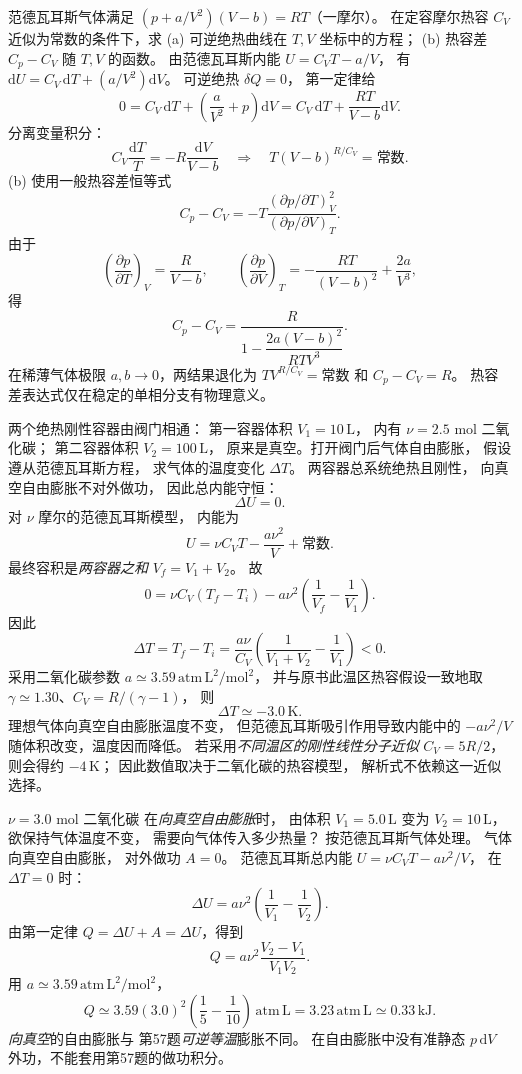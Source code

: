 范德瓦耳斯气体满足
$(p+a/V^2)(V-b)=RT$（一摩尔）。
在定容摩尔热容 $C_V$ 近似为常数的条件下，求
(a) 可逆绝热曲线在 $T,V$ 坐标中的方程；
(b) 热容差 $C_p-C_V$ 随 $T,V$ 的函数。
\exsolution
由范德瓦耳斯内能
$U=C_VT-a/V$，
有
$\mathrm dU=C_V\,\mathrm dT+(a/V^2)\mathrm dV$。
可逆绝热 $\delta Q=0$，
第一定律给
\[
0=C_V\,\mathrm dT+
\left(\frac a{V^2}+p\right)\mathrm dV
=C_V\,\mathrm dT+\frac{RT}{V-b}\mathrm dV.
\]
分离变量积分：
\[
C_V\frac{\mathrm dT}{T}
=-R\frac{\mathrm dV}{V-b}
\quad\Longrightarrow\quad
\boxed{T(V-b)^{R/C_V}=\text{常数}}.
\]
(b) 使用一般热容差恒等式
\[
C_p-C_V=
-T\frac{(\partial p/\partial T)_V^2}
{(\partial p/\partial V)_T}.
\]
由于
\[
\left(\frac{\partial p}{\partial T}\right)_V=\frac R{V-b},
\qquad
\left(\frac{\partial p}{\partial V}\right)_T
=-\frac{RT}{(V-b)^2}+\frac{2a}{V^3},
\]
得
\[
\boxed{C_p-C_V=
\frac R{1-\dfrac{2a(V-b)^2}{RTV^3}}}.
\]
\excheck 在稀薄气体极限
$a,b\to0$，两结果退化为
$TV^{R/C_V}=\text{常数}$ 和 $C_p-C_V=R$。
热容差表达式仅在稳定的单相分支有物理意义。

两个绝热刚性容器由阀门相通：
第一容器体积 $V_1=10\,\mathrm L$，
内有 $\nu=2.5$ mol 二氧化碳；
第二容器体积 $V_2=100\,\mathrm L$，
原来是真空。打开阀门后气体自由膨胀，
假设遵从范德瓦耳斯方程，
求气体的温度变化 $\Delta T$。
\exsolution
两容器总系统绝热且刚性，
向真空自由膨胀不对外做功，
因此总内能守恒：
\[
\Delta U=0.
\]
对 $\nu$ 摩尔的范德瓦耳斯模型，
内能为
\[
U=\nu C_VT-\frac{a\nu^2}{V}+\text{常数}.
\]
最终容积是\emph{两容器之和}
$V_f=V_1+V_2$。
故
\[
0=\nu C_V(T_f-T_i)
-a\nu^2\left(\frac1{V_f}-\frac1{V_1}\right).
\]
因此
\[
\boxed{\Delta T=T_f-T_i=
\frac{a\nu}{C_V}
\left(\frac1{V_1+V_2}-\frac1{V_1}\right)<0}.
\]
采用二氧化碳参数
$a\simeq3.59\,\mathrm{atm\,L^2/mol^2}$，
并与原书此温区热容假设一致地取
$\gamma\simeq1.30$、$C_V=R/(\gamma-1)$，
则
\[
\boxed{\Delta T\simeq-3.0\,\mathrm K}.
\]
\excheck 理想气体向真空自由膨胀温度不变，
但范德瓦耳斯吸引作用导致内能中的
$-a\nu^2/V$ 随体积改变，温度因而降低。
若采用\emph{不同温区的刚性线性分子近似}
$C_V=5R/2$，则会得约 $-4\,\mathrm K$；
因此数值取决于二氧化碳的热容模型，
解析式不依赖这一近似选择。

$\nu=3.0$ mol 二氧化碳
在\emph{向真空自由膨胀}时，
由体积 $V_1=5.0\,\mathrm L$
变为 $V_2=10\,\mathrm L$，
欲保持气体温度不变，
需要向气体传入多少热量？
按范德瓦耳斯气体处理。
\exsolution
气体向真空自由膨胀，
对外做功 $A=0$。
范德瓦耳斯总内能
$U=\nu C_VT-a\nu^2/V$，
在 $\Delta T=0$ 时：
\[
\Delta U=
a\nu^2\left(\frac1{V_1}-\frac1{V_2}\right).
\]
由第一定律
$Q=\Delta U+A=\Delta U$，得到
\[
\boxed{Q=a\nu^2\frac{V_2-V_1}{V_1V_2}}.
\]
用 $a\simeq3.59\,\mathrm{atm\,L^2/mol^2}$，
\[
Q\simeq3.59(3.0)^2
\left(\frac15-\frac1{10}\right)
\,\mathrm{atm\,L}
=3.23\,\mathrm{atm\,L}
\simeq\boxed{0.33\,\mathrm{kJ}}.
\]
\excheck \emph{向真空}的自由膨胀与
第57题\emph{可逆等温}膨胀不同。
在自由膨胀中没有准静态 $p\,\mathrm dV$
外功，不能套用第57题的做功积分。
